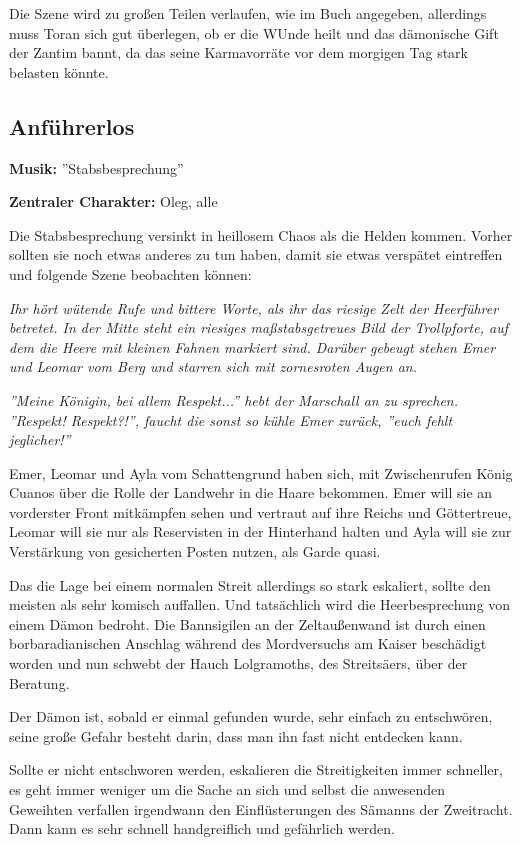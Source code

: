 Die Szene wird zu großen Teilen verlaufen, wie im Buch angegeben, allerdings muss Toran sich gut überlegen, ob er die WUnde heilt und das dämonische Gift der Zantim bannt, da das seine Karmavorräte vor dem morgigen Tag stark belasten könnte.

\subsection{Anführerlos}
\textbf{Musik:} ''Stabsbesprechung''

\textbf{Zentraler Charakter:} Oleg, alle 

Die Stabsbesprechung versinkt in heillosem Chaos als die Helden kommen. Vorher sollten sie noch etwas anderes zu tun haben, damit sie etwas verspätet eintreffen und folgende Szene beobachten können:

\emph{Ihr hört wütende Rufe und bittere Worte, als ihr das riesige Zelt der Heerführer betretet. In der Mitte steht ein riesiges maßstabsgetreues Bild der Trollpforte, auf dem die Heere mit kleinen Fahnen markiert sind. Darüber gebeugt stehen Emer und Leomar vom Berg und starren sich mit zornesroten Augen an.}

\emph{''Meine Königin, bei allem Respekt...'' hebt der Marschall an zu sprechen. ''Respekt! Respekt?!'', faucht die sonst so kühle Emer zurück, ''euch fehlt jeglicher!''}

Emer, Leomar und Ayla vom Schattengrund haben sich, mit Zwischenrufen König Cuanos über die Rolle der Landwehr in die Haare bekommen. Emer will sie an vorderster Front mitkämpfen sehen und vertraut auf ihre Reichs und Göttertreue, Leomar will sie nur als Reservisten in der Hinterhand halten und Ayla will sie zur Verstärkung von gesicherten Posten nutzen, als Garde quasi.

Das die Lage bei einem normalen Streit allerdings so stark eskaliert, sollte den meisten als sehr komisch auffallen. Und tatsächlich wird die Heerbesprechung von einem Dämon bedroht. Die Bannsigilen an der Zeltaußenwand ist durch einen borbaradianischen Anschlag während des Mordversuchs am Kaiser beschädigt worden und nun schwebt der Hauch Lolgramoths, des Streitsäers, über der Beratung.

Der Dämon ist, sobald er einmal gefunden wurde, sehr einfach zu entschwören, seine große Gefahr besteht darin, dass man ihn fast nicht entdecken kann.

Sollte er nicht entschworen werden, eskalieren die Streitigkeiten immer schneller, es geht immer weniger um die Sache an sich und selbst die anwesenden Geweihten verfallen irgendwann den Einflüsterungen des Sämanns der Zweitracht. Dann kann es sehr schnell handgreiflich und gefährlich werden.

